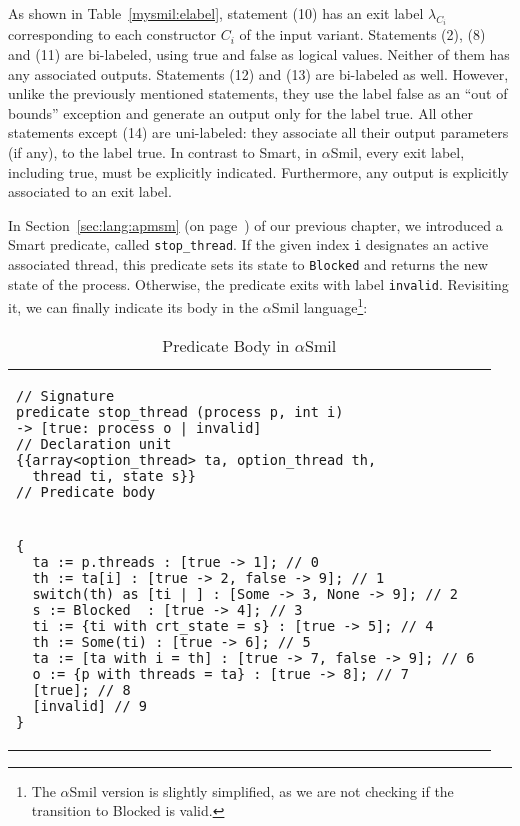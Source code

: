 \documentclass[11pt]{article}
\newcommand{\snumber}[1]{\textrm{{\scriptsize(#1)}}}
\def\slang{\textsf{Smart}}
\def\smil{\textsf{Smil}}
\newcommand{\disp}[1]{\lstinline&#1&}
\def\lbtrue{\textsf{true}}
\def\lbfalse{\textsf{false}}
\def\lbtrue{\textsf{true}}
\def\lbfalse{\textsf{false}}
\def\asmil{\textsf{$\alpha$Smil}}
\begin{document}
As shown in Table~\ref{mysmil:elabel}, statement \snumber{10} has an exit label
$\lambda_{C_i}$ corresponding to each constructor $C_i$ of the input variant.
Statements \snumber{2}, \snumber{8} and \snumber{11} are bi-labeled, using
{\lbtrue} and {\lbfalse} as logical values. Neither of them has any associated
outputs. Statements \snumber{12} and \snumber{13} are bi-labeled as well.
However, unlike the previously mentioned statements, they use the label
{\lbfalse} as an ``out of bounds'' exception and generate an output only for the
label {\lbtrue}. All other statements except \snumber{14} are uni-labeled: they
associate all their output parameters (if any), to the label {\lbtrue}. In
contrast to {\slang}, in {\asmil}, every exit label, including {\lbtrue}, must
be explicitly indicated. Furthermore, any output is explicitly associated to an
exit label.

In Section~\ref{sec:lang:apmsm} (on page~\pageref{ch3:stopthread:example}) of 
our previous chapter, we introduced a {\slang} 
predicate, called \disp{stop_thread}. If the given index \disp{i} designates an
active associated thread, this predicate sets its state to \disp{Blocked} and 
returns the new state of the process. Otherwise, the predicate exits with label
\disp{invalid}. Revisiting it, we can finally indicate its body in the {\asmil} 
language\footnote{The {\asmil} version is slightly simplified, as we are not checking
if the transition to \textsf{Blocked} is valid.}:

\begin{longtable}{l}
\caption{Predicate Body in {\asmil}}
\label{asmil:body:stop}\\
\toprule
\begin{lstlisting}
// Signature
predicate stop_thread (process p, int i)
-> [true: process o | invalid] 
// Declaration unit
{{array<option_thread> ta, option_thread th, 
  thread ti, state s}}
// Predicate body
\end{lstlisting}\\
\begin{lstlisting} 
{
  ta := p.threads : [true -> 1]; // 0
  th := ta[i] : [true -> 2, false -> 9]; // 1
  switch(th) as [ti | ] : [Some -> 3, None -> 9]; // 2
  s := Blocked  : [true -> 4]; // 3
  ti := {ti with crt_state = s} : [true -> 5]; // 4
  th := Some(ti) : [true -> 6]; // 5
  ta := [ta with i = th] : [true -> 7, false -> 9]; // 6 
  o := {p with threads = ta} : [true -> 8]; // 7
  [true]; // 8
  [invalid] // 9
}
\end{lstlisting}\\
\bottomrule
\end{longtable}
\end{document}
